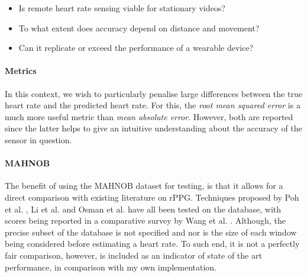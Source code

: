 % 
\begin{itemize}
    \item Is remote heart rate sensing viable for stationary videos?
    \item To what extent does accuracy depend on distance and movement?
    \item Can it replicate or exceed the performance of a wearable device?
\end{itemize}

\paragraph{Metrics}
In this context, we wish to particularly penalise large differences between the true heart rate and the predicted heart rate. For this, 
the \textit{root mean squared error} is a much more useful metric than \textit{mean absolute error}. However, both are reported since the latter helps
to give an intuitive understanding about the accuracy of the sensor in question.


\paragraph{MAHNOB}
The benefit of using the MAHNOB dataset for testing, is that it allows for a direct comparison with existing literature on rPPG.
Techniques proposed by Poh et al. \cite{poh}, Li et al. \cite{li} and Osman et al. \cite{osman} have all been tested on the database, with 
scores being reported in a comparative survey by Wang et al. \cite{comparative}.
Although, the precise subset of the database is not specified and nor is the size of each window being considered before estimating a heart rate.
To such end, it is not a perfectly fair comparison, however, is included as an indicator of state of the art performance, in comparison with my own implementation.

